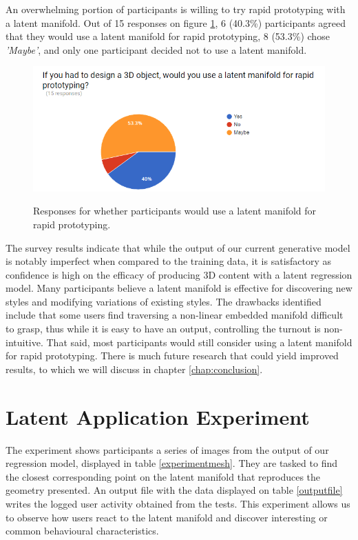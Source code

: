 \documentclass[ %
author={Dillon Keith Diep},
supervisor={Dr. Carl Henrik Ek},
degree={MEng},
title={ART-CG Hair:},
subtitle={Assisted Real-time Content Generation of Stylised Virtual Hair},
type={Research},
year={2017} ]{dissertation}
\begin{document}
An overwhelming portion of participants is willing to try rapid prototyping with a latent manifold. Out of 15 responses on figure \ref{surveyPrototype}, 6 (40.3\%) participants agreed that they would use a latent manifold for rapid prototyping, 8 (53.3\%) chose \textit{'Maybe'}, and only one participant decided not to use a latent manifold. 

\begin{figure}[!h]
	\centering
	\caption{Responses for whether participants would use a latent manifold for rapid prototyping.}
	\includegraphics[scale=0.7]{images/surveyPrototype}
	\label{surveyPrototype}
\end{figure}

The survey results indicate that while the output of our current generative model is notably imperfect when compared to the training data, it is satisfactory as confidence is high on the efficacy of producing 3D content with a latent regression model. Many participants believe a latent manifold is effective for discovering new styles and modifying variations of existing styles. The drawbacks identified include that some users find traversing a non-linear embedded manifold difficult to grasp, thus while it is easy to have an output, controlling the turnout is non-intuitive. That said, most participants would still consider using a latent manifold for rapid prototyping. There is much future research that could yield improved results, to which we will discuss in chapter \ref{chap:conclusion}.

\section{Latent Application Experiment}
The experiment shows participants a series of images from the output of our regression model, displayed in table \ref{experimentmesh}. They are tasked to find the closest corresponding point on the latent manifold that reproduces the geometry presented. An output file with the data displayed on table \ref{outputfile} writes the logged user activity obtained from the tests. This experiment allows us to observe how users react to the latent manifold and discover interesting or common behavioural characteristics.
\end{document}
